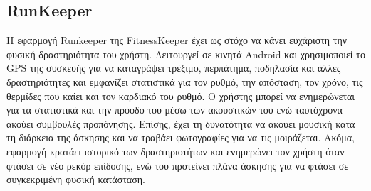 \documentclass[12pt,twoside,openright]{report}
\begin{document}
\subsection*{\lt RunKeeper \gt }
Η εφαρμογή \lt Runkeeper \gt της \lt FitnessKeeper \gt έχει ως στόχο να κάνει ευχάριστη την φυσική δραστηριότητα του χρήστη. Λειτουργεί σε κινητά \lt Android \gt και χρησιμοποιεί το \lt GPS \gt της συσκευής για να καταγράψει τρέξιμο, περπάτημα, ποδηλασία και άλλες δραστηριότητες και εμφανίζει στατιστικά για τον ρυθμό, την απόσταση, τον χρόνο, τις θερμίδες που καίει και τον καρδιακό του ρυθμό. Ο χρήστης μπορεί να ενημερώνεται για τα στατιστικά και την πρόοδο του μέσω των ακουστικών του ενώ ταυτόχρονα ακούει συμβουλές προπόνησης. Επίσης, έχει τη δυνατότητα να ακούει μουσική κατά τη διάρκεια της άσκησης και να τραβάει φωτογραφίες για να τις μοιράζεται. Ακόμα, εφαρμογή κρατάει ιστορικό των δραστηριοτήτων και ενημερώνει τον χρήστη όταν φτάσει σε νέο ρεκόρ επίδοσης, ενώ του προτείνει πλάνα άσκησης για να φτάσει σε συγκεκριμένη φυσική κατάσταση.
\end{document}

